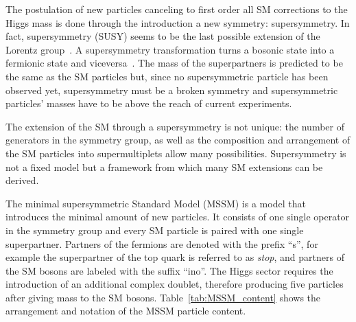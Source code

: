 The postulation of new particles canceling to first order all SM corrections to the Higgs mass is done through the introduction a new symmetry: supersymmetry.
In fact, supersymmetry (SUSY) seems to be the last possible extension of the Lorentz group~\cite{Haag:1974qh}.
A supersymmetry transformation turns a bosonic state into a fermionic state and viceversa~\cite{Drees:1996ca}. 
The mass of the superpartners is predicted to be the same as the SM particles but, since no supersymmetric particle has been observed yet, supersymmetry must be a broken symmetry and supersymmetric particles' masses have to be above the reach of current experiments.

The extension of the SM through a supersymmetry is not unique: the number of generators in the symmetry group, as well as the composition and arrangement of the SM particles into supermultiplets allow many possibilities. Supersymmetry is not a fixed model but a framework from which many SM extensions can be derived. 

The minimal supersymmetric Standard Model (MSSM) is a model that introduces the minimal amount of new particles. It consists of one single operator in the symmetry group and every SM particle is paired with one single superpartner. Partners of the fermions are denoted with the prefix ``s'', for example the superpartner of the top quark is referred to as \textit{stop}, and partners of the SM bosons are labeled with the suffix ``ino''. The Higgs sector requires the introduction of an additional complex doublet, therefore producing five particles after giving mass to the SM bosons. Table~\ref{tab:MSSM_content} shows the arrangement and notation of the MSSM particle content.

